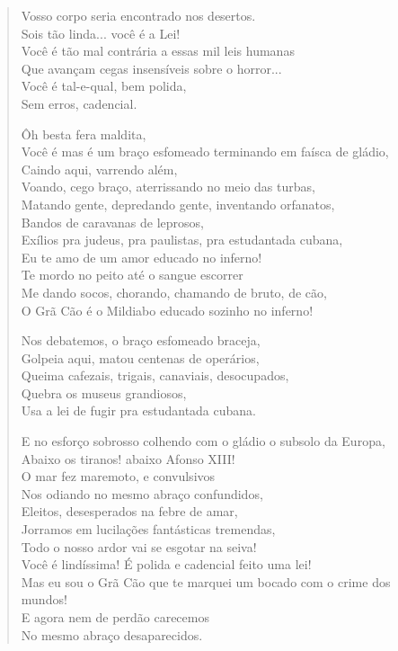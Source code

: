 \begin{verse}
Vosso corpo seria encontrado nos desertos.\\
Sois tão linda... você é a Lei!\\
Você é tão mal contrária a essas mil leis humanas\\
Que avançam cegas insensíveis sobre o horror...\\
Você é tal-e-qual, bem polida,\\
Sem erros, cadencial.

Ôh besta fera maldita,\\
Você é mas é um braço esfomeado terminando em faísca de gládio,\\
Caindo aqui, varrendo além,\\
Voando, cego braço, aterrissando no meio das turbas,\\
Matando gente, depredando gente, inventando orfanatos,\\
Bandos de caravanas de leprosos,\\
Exílios pra judeus, pra paulistas, pra estudantada cubana,\\
Eu te amo de um amor educado no inferno!\\
Te mordo no peito até o sangue escorrer\\
Me dando socos, chorando, chamando de bruto, de cão,\\
O Grã Cão é o Mildiabo educado sozinho no inferno!

Nos debatemos, o braço esfomeado braceja,\\
Golpeia aqui, matou centenas de operários,\\
Queima cafezais, trigais, canaviais, desocupados,\\
Quebra os museus grandiosos,\\
Usa a lei de fugir pra estudantada cubana.

E no esforço sobrosso colhendo com o gládio o subsolo da Europa,\\
Abaixo os tiranos! abaixo Afonso XIII!\\
O mar fez maremoto, e convulsivos\\
Nos odiando no mesmo abraço confundidos,\\
Eleitos, desesperados na febre de amar,\\
Jorramos em lucilações fantásticas tremendas,\\
Todo o nosso ardor vai se esgotar na seiva!\\
Você é lindíssima! É polida e cadencial feito uma lei!\\
Mas eu sou o Grã Cão que te marquei um bocado com o crime dos mundos!\\
E agora nem de perdão carecemos\\
No mesmo abraço desaparecidos.
\end{verse}


